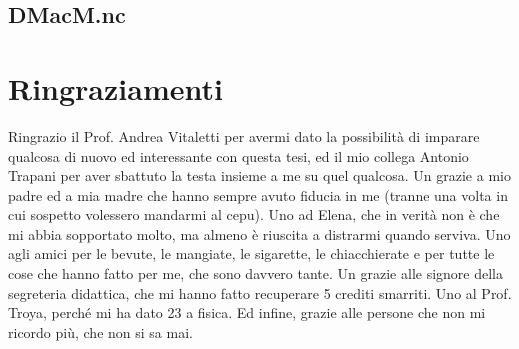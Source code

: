 \documentclass[twoside,11pt,a4paper,italian,openany]{book}
\begin{document}
\section{DMacM.nc}

%
%
%
%


\backmatter
\chapter{Ringraziamenti}
Ringrazio il Prof. Andrea Vitaletti per avermi dato la possibilità di imparare qualcosa di nuovo 
ed interessante con questa tesi, ed il mio collega Antonio Trapani per aver sbattuto la testa 
insieme a me su quel qualcosa. 
Un grazie a mio padre ed a mia madre che hanno sempre avuto fiducia in me (tranne una 
volta in cui sospetto volessero mandarmi al cepu). Uno ad Elena, che in verità non è che mi 
abbia sopportato molto, ma almeno è riuscita a distrarmi quando serviva. 
Uno agli amici per le bevute, le mangiate, le sigarette, le chiacchierate e per tutte le 
cose che hanno fatto per me, che sono davvero tante. Un grazie alle signore della segreteria 
didattica, che mi hanno fatto recuperare 5 crediti smarriti. Uno al Prof. Troya, perché mi ha
dato 23 a fisica. Ed infine, grazie alle persone che non mi ricordo più, che non si sa mai. 
\end{document}
